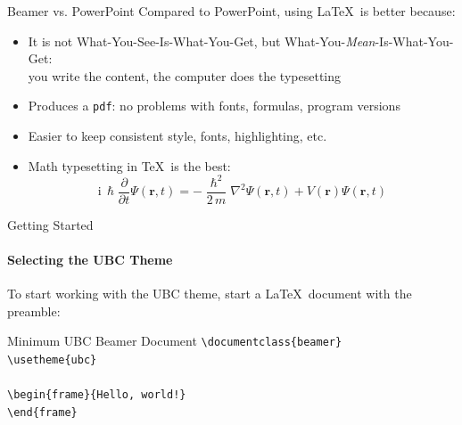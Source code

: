 \begin{frame}{Beamer vs. PowerPoint}
Compared to PowerPoint, using \LaTeX\ is better because:
\begin{itemize}
\item It is not What-You-See-Is-What-You-Get, but
What-You-\emph{Mean}-Is-What-You-Get:\\
you write the content, the computer does the typesetting
\item Produces a \texttt{pdf}: no problems with fonts, formulas,
      program versions
\item Easier to keep consistent style, fonts, highlighting, etc.
\item Math typesetting in \TeX\ is the best:
\begin{equation*}
\mathrm{i}\,\hslash\frac{\partial}{\partial t} \Psi(\mathbf{r},t) =
-\frac{\hslash^2}{2\,m}\nabla^2\Psi(\mathbf{r},t)
+ V(\mathbf{r})\Psi(\mathbf{r},t)
\end{equation*}

\end{itemize}
\end{frame}

\begin{frame}[fragile]{Getting Started}
\framesubtitle{Selecting the UBC Theme}
To start working with the UBC theme, start a \LaTeX\ document with the
preamble:
\begin{block}{Minimum UBC Beamer Document}
\verb|\documentclass{beamer}|\\
\verb|\usetheme{ubc}|\\
\verb||\\
\verb|\begin{frame}{Hello, world!}|\\
\verb|\end{frame}|\\
\verb||\\
\end{block}
\end{frame}

